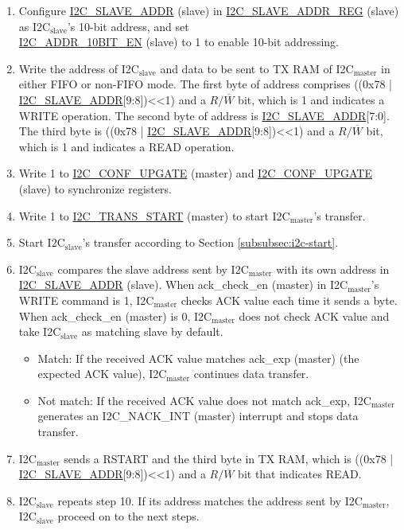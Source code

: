 \documentclass[main\_\_EN.tex]{subfiles}
\begin{document}
\begin{enumerate}
\item Configure \hyperref[fielddesc:I2CSLAVEADDR]{I2C\_SLAVE\_ADDR} (slave) in \hyperref[regdesc:I2CSLAVEADDRREG]{I2C\_SLAVE\_ADDR\_REG} (slave) as I2C$_\text{slave}$'s 10-bit address, and set \\\hyperref[fielddesc:I2CADDR10BITEN]{I2C\_ADDR\_10BIT\_EN} (slave) to 1 to enable 10-bit addressing.
\item Write the address of I2C$_\text{slave}$ and data to be sent to TX RAM of I2C$_\text{master}$ in either FIFO or non-FIFO mode. The first byte of address comprises ((0x{}78 | \hyperref[fielddesc:I2CSLAVEADDR]{I2C\_SLAVE\_ADDR}[9:8])<<1) and a $R/\overline W$ bit, which is 1 and indicates a WRITE operation. The second byte of address is \hyperref[fielddesc:I2CSLAVEADDR]{I2C\_SLAVE\_ADDR}[7:0]. The third byte is ((0x{}78 | \hyperref[fielddesc:I2CSLAVEADDR]{I2C\_SLAVE\_ADDR}[9:8])<<1) and a $R/\overline W$ bit, which is 1 and indicates a READ operation.

\item Write 1 to \hyperref[fielddesc:I2CCONFUPGATE]{I2C\_CONF\_UPGATE} (master) and \hyperref[fielddesc:I2CCONFUPGATE]{I2C\_CONF\_UPGATE} (slave) to synchronize registers.
\item Write 1 to \hyperref[fielddesc:I2CTRANSSTART]{I2C\_TRANS\_START} (master) to start I2C$_\text{master}$'s transfer.
\item Start I2C$_\text{slave}$'s transfer according to Section \ref{subsubsec:i2c-start}.
\item I2C$_\text{slave}$ compares the slave address sent by I2C$_\text{master}$ with its own address in \hyperref[fielddesc:I2CSLAVEADDR]{I2C\_SLAVE\_ADDR} (slave). When ack\_check\_en (master) in I2C$_\text{master}$'s WRITE command is 1, I2C$_\text{master}$ checks ACK value each time it sends a byte. When ack\_check\_en (master) is 0, I2C$_\text{master}$ does not check ACK value and take I2C$_\text{slave}$ as matching slave by default.
\begin{itemize}
\item Match: If the received ACK value matches ack\_exp (master) (the expected ACK value), I2C$_\text{master}$ continues data transfer.
\item Not match: If the received ACK value does not match ack\_exp, I2C$_\text{master}$ generates an I2C\_NACK\_INT (master) interrupt and stops data transfer.
\end{itemize}

\item I2C$_\text{master}$ sends a RSTART and the third byte in TX RAM, which is ((0x{}78 | \hyperref[fielddesc:I2CSLAVEADDR]{I2C\_SLAVE\_ADDR}[9:8])<<1) and a $R/\overline W$ bit that indicates READ.
\item I2C$_\text{slave}$ repeats step 10. If its address matches the address sent by I2C$_\text{master}$, I2C$_\text{slave}$ proceed on to the next steps.


\end{enumerate}
\end{document}
